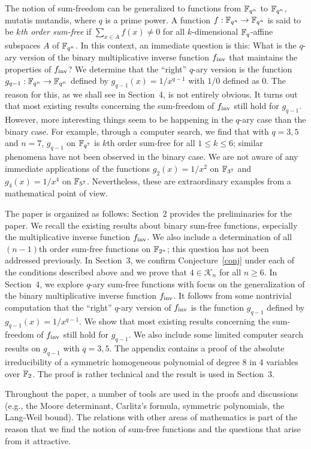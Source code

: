 \documentclass{amsart}
\numberwithin{equation}{section}
\theoremstyle{definition}
\newcommand{\f}{\Bbb F}
\newcommand{\fin}{f_{\text{\rm inv}}}
\begin{document}
The notion of sum-freedom can be generalized to functions from $\f_{q^n}$ to $\f_{q^n}$, mutatis mutandis, where $q$ is a prime power. A function $f:\f_{q^n}\to\f_{q^n}$ is said to be {\em $k$th order sum-free} if $\sum_{x\in A}f(x)\ne 0$ for all $k$-dimensional $\f_q$-affine subspaces $A$ of $\f_{q^n}$. In this context, an immediate question is this: What is the $q$-ary version of the binary multiplicative inverse function $\fin$ that maintains the properties of $\fin$? We determine that the ``right'' $q$-ary version is the function $g_{q-1}:\f_{q^n}\to\f_{q^n}$ defined by $g_{q-1}(x)=1/x^{q-1}$ with $1/0$ defined as $0$. The reason for this, as we shall see in Section~4, is not entirely obvious. It turns out that most existing results concerning the sum-freedom of $\fin$ still hold for $g_{q-1}$. However, more interesting things seem to be happening in the $q$-ary case than the binary case. For example, through a computer search, we find that with $q=3,5$ and $n=7$, $g_{q-1}$ on $\f_{q^7}$ is $k$th order sum-free for all $1\le k\le 6$; similar phenomena have not been observed in the binary case. We are not aware of any immediate applications of the functions $g_2(x)=1/x^2$ on $\f_{3^7}$ and $g_4(x)=1/x^4$ on $\f_{5^7}$. Nevertheless, these are extraordinary examples from a mathematical point of view.

The paper is organized as follows: Section~2 provides the preliminaries for the paper. We recall the existing results about binary sum-free functions, especially the multiplicative inverse function $\fin$. We also include a determination of all $(n-1)$th order sum-free functions on $\f_{2^n}$; this question has not been addressed previously. In Section~3, we confirm Conjecture~\ref{conj} under each of the conditions described above and we prove that $4\in\mathcal K_n$ for all $n\ge 6$. In Section~4, we explore $q$-ary sum-free functions with focus on the generalization of the binary multiplicative inverse function $\fin$. It follows from some nontrivial computation that the ``right'' $q$-ary version of $\fin$ is the function $g_{q-1}$ defined by $g_{q-1}(x)=1/x^{q-1}$. We show that most existing results concerning the sum-freedom of $\fin$ still hold for $g_{q-1}$. We also include some limited computer search results on $g_{q-1}$ with $q=3,5$. The appendix contains a proof of the absolute irreducibility of a symmetric homogeneous polynomial of degree 8 in 4 variables over $\f_2$. The proof is rather technical and the result is used in Section~3.

Throughout the paper, a number of tools are used in the proofs and discussions (e.g., the Moore determinant, Carlitz's formula, symmetric polynomials, the Lang-Weil bound). The relations with other areas of mathematics is part of the reason that we find the notion of sum-free functions and the questions that arise from it attractive.
\end{document}
